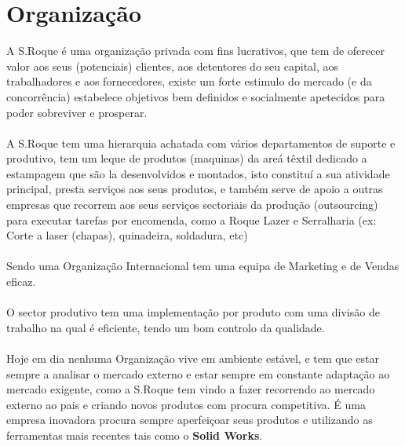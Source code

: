 {\section{Organização}
\qquad A S.Roque é uma organização privada com fins lucrativos, que tem de oferecer valor aos seus (potenciais) clientes, aos detentores do seu capital, aos trabalhadores e aos fornecedores, existe um forte estimulo do mercado (e da concorrência) estabelece objetivos bem definidos e socialmente apetecidos para poder sobreviver e prosperar.\\
\\
A S.Roque tem uma hierarquia achatada com vários departamentos de suporte e produtivo, tem um leque de produtos (maquinas) da areá têxtil dedicado a estampagem que são la desenvolvidos e montados, isto constituí a sua atividade principal, presta serviços aos seus produtos, e também serve de apoio a outras empresas que recorrem aos seus serviços sectoriais da produção (outsourcing) para executar tarefas por encomenda, como a Roque Lazer e Serralharia (ex: Corte a laser (chapas), quinadeira, soldadura, etc)\\
\\
Sendo uma Organização Internacional tem uma equipa de Marketing e de Vendas eficaz.\\
\\
O sector produtivo tem uma implementação por produto com uma divisão de trabalho na qual é eficiente, tendo um bom controlo da qualidade.\\
\\
Hoje em dia nenhuma Organização vive em ambiente estável, e tem que estar sempre a analisar o mercado externo e estar sempre em constante adaptação ao mercado exigente, como a S.Roque tem vindo a fazer recorrendo ao mercado externo ao pais e criando novos produtos com procura competitiva. É uma empresa inovadora procura sempre aperfeiçoar seus produtos e utilizando as ferramentas mais recentes tais como o \textbf{Solid Works}.\\









}
